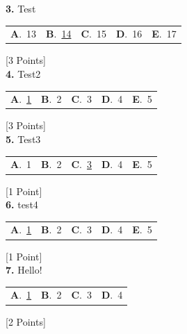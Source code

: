 \documentclass[12pt]{article}
\newcommand{\choice}[2]{\textbf{#1}.~#2}
\begin{document}
\noindent \textbf{\textenglish{3.}} {\textenglish{Test}}

\begin{tabularx}{\linewidth}{@{}*{5}{Y}@{}}
\choice{A}{{{\textenglish{13}}}} & \choice{B}{{\underline{{\textenglish{14}}}}} & \choice{C}{{{\textenglish{15}}}} & \choice{D}{{{\textenglish{16}}}} & \choice{E}{{{\textenglish{17}}}} \\
\end{tabularx}
\hfill {\textenglish{[3 Points]}}\\[0.5em]

\noindent \textbf{\textenglish{4.}} {\textenglish{Test2}}

\begin{tabularx}{\linewidth}{@{}*{5}{Y}@{}}
\choice{A}{{\underline{{\textenglish{1}}}}} & \choice{B}{{{\textenglish{2}}}} & \choice{C}{{{\textenglish{3}}}} & \choice{D}{{{\textenglish{4}}}} & \choice{E}{{{\textenglish{5}}}} \\
\end{tabularx}
\hfill {\textenglish{[3 Points]}}\\[0.5em]

\noindent \textbf{\textenglish{5.}} {\textenglish{Test3}}

\begin{tabularx}{\linewidth}{@{}*{5}{Y}@{}}
\choice{A}{{{\textenglish{1}}}} & \choice{B}{{{\textenglish{2}}}} & \choice{C}{{\underline{{\textenglish{3}}}}} & \choice{D}{{{\textenglish{4}}}} & \choice{E}{{{\textenglish{5}}}} \\
\end{tabularx}
\hfill {\textenglish{[1 Point]}}\\[0.5em]

\noindent \textbf{\textenglish{6.}} {\textenglish{test4}}

\begin{tabularx}{\linewidth}{@{}*{5}{Y}@{}}
\choice{A}{{\underline{{\textenglish{1}}}}} & \choice{B}{{{\textenglish{2}}}} & \choice{C}{{{\textenglish{3}}}} & \choice{D}{{{\textenglish{4}}}} & \choice{E}{{{\textenglish{5}}}} \\
\end{tabularx}
\hfill {\textenglish{[1 Point]}}\\[0.5em]

\noindent \textbf{\textenglish{7.}} {\textenglish{Hello!}}

\begin{tabularx}{\linewidth}{@{}*{4}{Y}@{}}
\choice{A}{{\underline{{\textenglish{1}}}}} & \choice{B}{{{\textenglish{2}}}} & \choice{C}{{{\textenglish{3}}}} & \choice{D}{{{\textenglish{4}}}} \\
\end{tabularx}
\hfill {\textenglish{[2 Points]}}\\[0.5em]
\end{document}
